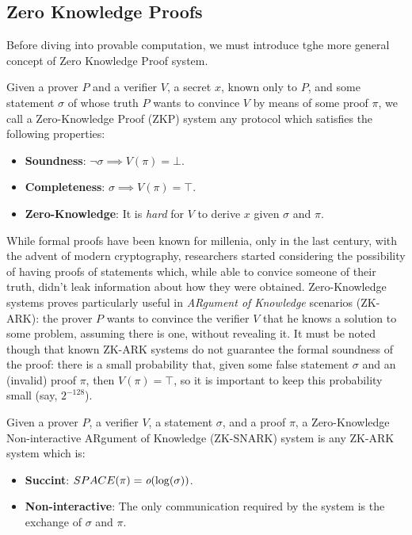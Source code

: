 \subsection{Zero Knowledge Proofs}
Before diving into provable computation, we must introduce tghe more general concept of Zero
Knowledge Proof system.
\begin{definition}
	Given a prover \(P\) and a verifier \(V\), a secret \(x\), known only to \(P\), and some
	statement \(\sigma \) of whose truth \(P\) wants to convince \(V\) by means of
	some proof \(\pi \), we call a Zero-Knowledge Proof (ZKP) system any protocol which satisfies
	the following properties:
	\begin{itemize}
		\item \textbf{Soundness}: \(\neg{\sigma} \implies V(\pi) = \bot \).
		\item \textbf{Completeness}: \(\sigma \implies V(\pi) = \top \).
		\item \textbf{Zero-Knowledge}: It is \emph{hard} for \(V\) to derive \(x\) given \(\sigma \)
		      and \(\pi \).
	\end{itemize}
\end{definition}

\noindent While formal proofs have been known for millenia, only in the last century, with the
advent of modern cryptography, researchers started considering the possibility of having proofs
of statements which, while able to convice someone of their truth, didn't leak information
about how they were obtained.
Zero-Knowledge systems proves particularly useful in \emph{ARgument of Knowledge} scenarios
(ZK-ARK): the prover \(P\) wants to convince the verifier \(V\) that he
knows a solution to some problem, assuming there is one, without revealing it.
It must be noted though that known ZK-ARK systems do not guarantee the formal soundness of
the proof: there is a small probability that, given some false statement \(\sigma \) and an
(invalid) proof \(\pi \), then \(V(\pi) = \top \), so it is important to keep this probability
small (say, \(2^{-128}\)).
\begin{definition}[ZK-SNARK]
	Given a prover \(P\), a verifier \(V\), a statement \(\sigma \), and a proof \(\pi \), a 
  Zero-Knowledge Non-interactive ARgument of Knowledge (ZK-SNARK) system is any ZK-ARK system 
  which is:
	\begin{itemize}
		\item \textbf{Succint}: \(SPACE(\pi) = \textit{o}(\log(\sigma))\).
		\item \textbf{Non-interactive}: The only communication required by the system is the exchange
		      of \(\sigma \) and \(\pi \).
	\end{itemize}
\end{definition}

